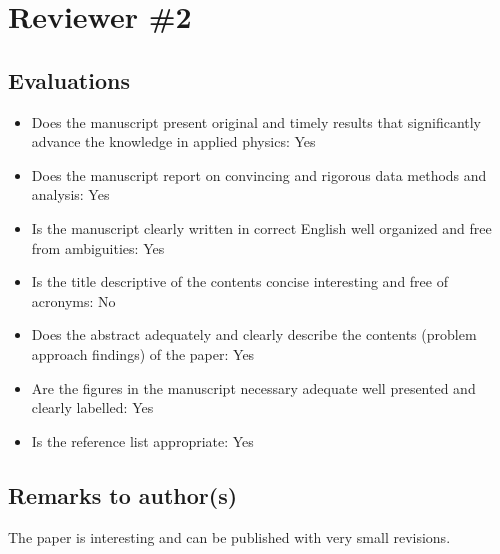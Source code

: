 \documentclass[%
 aip,
 amsmath,amssymb,
 reprint,%
]{revtex4-1}
\begin{document}
\section{Reviewer \#2}
\subsection{Evaluations}

\begin{itemize}
  \item Does the manuscript present original and timely results that significantly advance the knowledge in
   applied physics: Yes
  \item Does the manuscript report on convincing and rigorous data methods and analysis: Yes
  \item Is the manuscript clearly written in correct English well organized and free from ambiguities: Yes
  \item Is the title descriptive of the contents concise interesting and free of acronyms: No
  \item Does the abstract adequately and clearly describe the contents (problem approach findings) of the
   paper: Yes
  \item Are the figures in the manuscript necessary adequate well presented and clearly labelled: Yes
  \item Is the reference list appropriate: Yes

\end{itemize}


\subsection{Remarks to author(s)}

  The paper is interesting and can be published with very small revisions.
\end{document}
